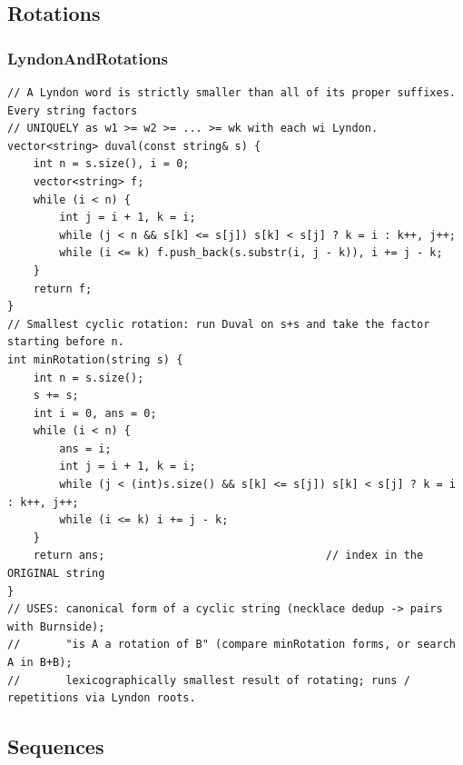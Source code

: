 \documentclass[9pt,a4paper,twocolumn]{extarticle}
\begin{document}
\subsection{Rotations}

\filbreak
\subsubsection{LyndonAndRotations}
\nopagebreak
\begin{lstlisting}
// A Lyndon word is strictly smaller than all of its proper suffixes. Every string factors
// UNIQUELY as w1 >= w2 >= ... >= wk with each wi Lyndon.
vector<string> duval(const string& s) {
    int n = s.size(), i = 0;
    vector<string> f;
    while (i < n) {
        int j = i + 1, k = i;
        while (j < n && s[k] <= s[j]) s[k] < s[j] ? k = i : k++, j++;
        while (i <= k) f.push_back(s.substr(i, j - k)), i += j - k;
    }
    return f;
}
// Smallest cyclic rotation: run Duval on s+s and take the factor starting before n.
int minRotation(string s) {
    int n = s.size();
    s += s;
    int i = 0, ans = 0;
    while (i < n) {
        ans = i;
        int j = i + 1, k = i;
        while (j < (int)s.size() && s[k] <= s[j]) s[k] < s[j] ? k = i : k++, j++;
        while (i <= k) i += j - k;
    }
    return ans;                                  // index in the ORIGINAL string
}
// USES: canonical form of a cyclic string (necklace dedup -> pairs with Burnside);
//       "is A a rotation of B" (compare minRotation forms, or search A in B+B);
//       lexicographically smallest result of rotating; runs / repetitions via Lyndon roots.
\end{lstlisting}

\subsection{Sequences}

\filbreak
\end{document}
